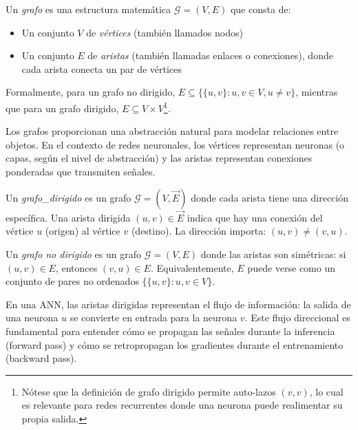 \begin{definition}\label{def:grafo_neuronal}
Un \textit{\gls{grafo}} es una estructura matemática $\mathcal{G} = (V, E)$ que consta de:
\begin{itemize}
    \item Un conjunto $V$ de \textit{vértices} (también llamados nodos)
    \item Un conjunto $E$ de \textit{aristas} (también llamadas enlaces o conexiones), donde cada arista conecta un par de vértices
\end{itemize}
Formalmente, para un grafo no dirigido, $E \subseteq \{\{u, v\} : u, v \in V, u \neq v\}$, mientras que para un grafo dirigido, $E \subseteq V \times V$\footnote{Nótese que la definición de grafo dirigido permite auto-lazos $(v, v)$, lo cual es relevante para redes recurrentes donde una neurona puede realimentar su propia salida.}.
\end{definition}

Los grafos proporcionan una abstracción natural para modelar relaciones entre objetos. En el contexto de redes neuronales, los vértices representan neuronas (o capas, según el nivel de abstracción) y las aristas representan conexiones ponderadas que transmiten señales.

\begin{definition}\label{def:grafo_dirigido}
Un \textit{\gls{grafo_dirigido}} es un grafo $\mathcal{G} = (V, \vec{E})$ donde cada arista tiene una dirección específica. Una arista dirigida $(u, v) \in \vec{E}$ indica que hay una conexión del vértice $u$ (origen) al vértice $v$ (destino). La dirección importa: $(u, v) \neq (v, u)$.
\end{definition}

\begin{definition}\label{def:grafo_no_dirigido}
Un \textit{grafo no dirigido} es un grafo $\mathcal{G} = (V, E)$ donde las aristas son simétricas: si $(u, v) \in E$, entonces $(v, u) \in E$. Equivalentemente, $E$ puede verse como un conjunto de pares no ordenados $\{\{u, v\} : u, v \in V\}$.
\end{definition}

En una \gls{ANN}, las aristas dirigidas representan el flujo de información: la salida de una neurona $u$ se convierte en entrada para la neurona $v$. Este flujo direccional es fundamental para entender cómo se propagan las señales durante la inferencia (forward pass) y cómo se retropropagan los gradientes durante el entrenamiento (backward pass).


